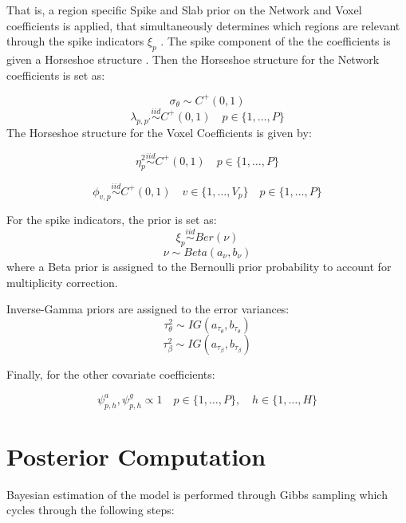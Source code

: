 \documentclass[
]{article}
\begin{document}
That is, a region specific Spike and Slab prior on the Network and Voxel coefficients is applied, that simultaneously determines
which regions are relevant through the spike indicators \(\xi_p\) \citep{george1997approaches}. The spike component of the the coefficients is given a Horseshoe structure \citep{carvalho2010horseshoe}. Then the Horseshoe structure for the Network coefficients is set as:

\[\sigma_\theta \sim C^+(0,1) \]
\[\lambda_{p,p'} \stackrel{iid}{\sim} C^+(0,1) \quad p \in \{1,\ldots,P\} \]
The Horseshoe structure for the Voxel Coefficients is given by:

\[\eta^2_p \stackrel{iid}{\sim} C^+(0,1) \quad p \in \{1,\ldots,P\} \]

\[\phi_{v,p} \stackrel{iid}{\sim} C^+(0,1) \quad v \in \{1,\ldots,V_p\} \quad p \in \{1,\ldots,P\} \]

For the spike indicators, the prior is set as:
\[  \xi_p \stackrel{iid}{\sim} Ber(\nu) \]
\[ \nu \sim Beta(a_\nu, b_\nu) \]
where a Beta prior is assigned to the Bernoulli prior probability to account for multiplicity correction.

Inverse-Gamma priors are assigned to the error variances:
\[ \tau^2_\theta \sim IG(a_{\tau_\theta}, b_{\tau_\theta}) \]
\[ \tau^2_\beta \sim IG(a_{\tau_\beta}, b_{\tau_\beta}) \]

Finally, for the other covariate coefficients:

\[ \psi_{p,h}^a,\psi^g_{p,h} \propto 1 \quad p \in \{1,\ldots,P\}, \quad h \in \{1,\ldots,H\} \]

\section{Posterior Computation}\label{posteriorComputation}

Bayesian estimation of the model is performed through Gibbs sampling which
cycles through the following steps:
\end{document}

